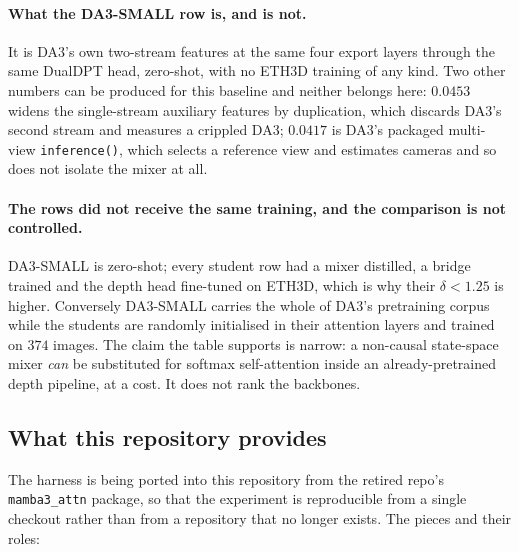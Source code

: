 \documentclass[11pt,a4paper]{article}
\begin{document}
\paragraph{What the DA3-SMALL row is, and is not.} It is DA3's own two-stream features at the
same four export layers through the same DualDPT head, zero-shot, with no ETH3D training of any
kind. Two other numbers can be produced for this baseline and neither belongs here: $0.0453$
widens the single-stream auxiliary features by duplication, which discards DA3's second stream
and measures a crippled DA3; $0.0417$ is DA3's packaged multi-view \texttt{inference()}, which
selects a reference view and estimates cameras and so does not isolate the mixer at all.

\paragraph{The rows did not receive the same training, and the comparison is not controlled.}
DA3-SMALL is zero-shot; every student row had a mixer distilled, a bridge trained and the depth
head fine-tuned on ETH3D, which is why their $\delta{<}1.25$ is higher. Conversely DA3-SMALL
carries the whole of DA3's pretraining corpus while the students are randomly initialised in
their attention layers and trained on $374$ images. The claim the table supports is narrow: a
non-causal state-space mixer \emph{can} be substituted for softmax self-attention inside an
already-pretrained depth pipeline, at a cost. It does not rank the backbones.

\subsection{What this repository provides}
\label{sec:eth3d-depth-harness}

The harness is being ported into this repository from the retired repo's
\texttt{mamba3\_attn} package, so that the experiment is reproducible from a
single checkout rather than from a repository that no longer exists. The pieces
and their roles:
\end{document}
